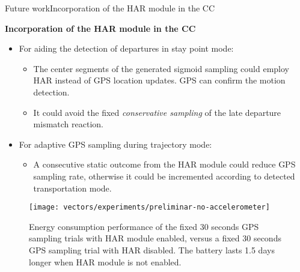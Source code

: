 \begin{frame}{Future work}{Incorporation of the HAR module in the CC}
\small
\vspace{-0.3cm}
\begin{block}{\small \textbf{Incorporation of the HAR module in the CC}}
\begin{itemize}
	\item For aiding the detection of departures in stay point mode:
	\begin{itemize}
		\item The center segments of the generated sigmoid sampling could employ HAR instead of GPS location updates. 
		GPS can confirm the motion detection.
		\item It could avoid the fixed \emph{conservative sampling} of the late departure mismatch reaction.
	\end{itemize}

	\item For adaptive GPS sampling during trajectory mode:
	\begin{itemize}
		\item A consecutive static outcome from the HAR module could reduce GPS sampling rate, otherwise it could be incremented according to detected transportation mode.
	\end{itemize}
\end{itemize}
\end{block}

\begin{figure}
  \texttt{[image: vectors/experiments/preliminar-no-accelerometer]}
  \caption{Energy consumption performance of the fixed 30 seconds GPS sampling trials with HAR module enabled, versus a fixed 30 seconds GPS sampling trial with HAR disabled. The battery lasts 1.5 days longer when HAR module is not enabled.}
\end{figure}
\end{frame}

